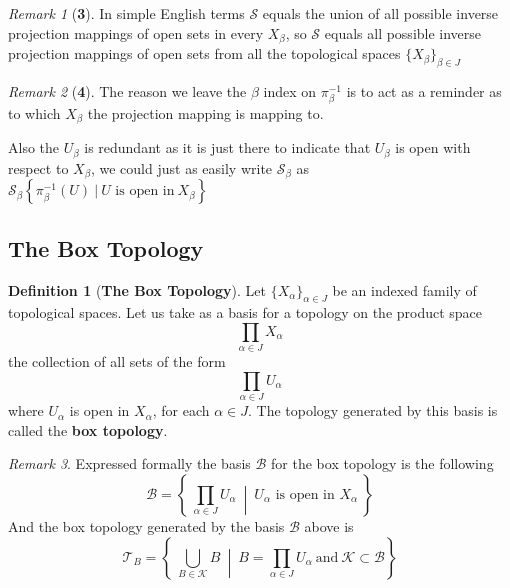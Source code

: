 \documentclass{article}
\theoremstyle{remark}
\newtheorem*{remark}{Remark}
\theoremstyle{definition}
\newtheorem{definition}{Definition}[section]
\begin{document}
\newpage


\begin{remark}[\textbf{3}]
In simple English terms $\mathcal{S}$ equals the union of all possible inverse projection mappings of open sets in every $X_{\beta}$, so $\mathcal{S}$ equals all possible inverse projection mappings of open sets from all the topological spaces $\{X_{\beta}\}_{\beta \in J}$
\end{remark}

\medskip

\begin{remark}[\textbf{4}]
The reason we leave the $\beta$ index on $\pi^{-1}_{\beta}$ is to act as a reminder as to which $X_{\beta}$ the projection mapping is mapping to. 

Also the $U_{\beta}$ is redundant as it is just there to indicate that $U_{\beta}$ is open with respect to $X_{\beta}$, we could just as easily write $\mathcal{S}_{\beta}$ as $\mathcal{S}_{\beta} \left\{ \pi_{\beta}^{-1}(U) \ | \ U \text{ is open in} \ X_{\beta}\right\}$ 
\end{remark}

\newpage

\subsection{The Box Topology}

\bigskip

\begin{definition}[\textbf{The Box Topology}]
Let $\{X_{\alpha}\}_{\alpha \in J}$ be an indexed family of topological spaces. Let us take as a basis for a topology on the product space $$\prod_{\alpha \in J}X_{\alpha}$$ the collection of all sets of the form $$\prod_{\alpha \in J}U_{\alpha}$$ where $U_{\alpha}$ is open in $X_{\alpha}$, for each $\alpha \in J$. The topology generated by this basis is called the \textbf{box topology}.
\end{definition}

\begin{remark}
Expressed formally the basis $\mathcal{B}$ for the box topology is the following
$$\mathcal{B} = \left\{ \ \prod_{\alpha \in J}U_{\alpha} \ \middle| \ \text{$U_{\alpha}$ is open in $X_{\alpha}$} \ \right\}$$
And the box topology generated by the basis $\mathcal{B}$ above is
$$\mathcal{T}_B = \left\{ \ \bigcup_{B \in \mathcal{K}} B \ \middle| \ B = \prod_{\alpha \in J}U_{\alpha} \ \text{and} \ \mathcal{K} \subset \mathcal{B} \right\}$$
\end{remark}
\end{document}
